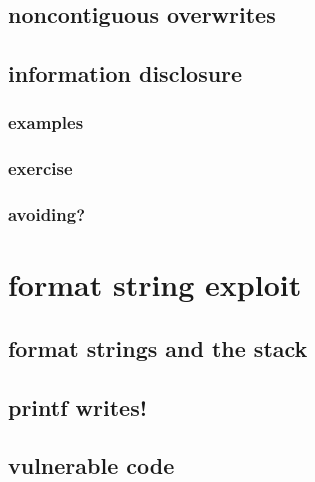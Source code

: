 \subsection{noncontiguous overwrites}





\subsection{information disclosure}
\subsubsection{examples}


\subsubsection{exercise}


\subsubsection{avoiding?}




\section{format string exploit}

\subsection{format strings and the stack}


\subsection{printf writes!}


\subsection{vulnerable code}


